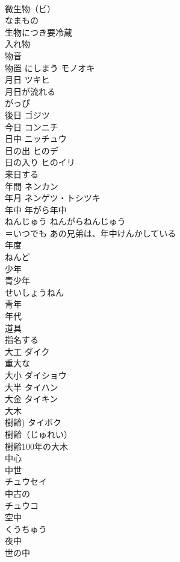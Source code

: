 \documentclass[8pt]{extreport}
\begin{document}
\begin{CJK}{UTF8}{min}
\\	微生物（ビ）
\\	なまもの　
\\	生物につき要冷蔵 
\\	入れ物	
\\	物音	
\\	物置 にしまう	モノオキ 
\\	月日	ツキヒ 
\\	月日が流れる 
\\	がっぴ　
\\	後日	ゴジツ 
\\	今日	コンニチ 
\\	日中	ニッチュウ 
\\	日の出	ヒのデ 
\\	日の入り	ヒのイリ 
\\	来日する	
\\	年間	ネンカン 
\\	年月	ネンゲツ・トシツキ 
\\	年中 年がら年中	
\\	ねんじゅう ねんがらねんじゅう 
\\	＝いつでも あの兄弟は、年中けんかしている
\\	年度	
\\	ねんど
\\	少年	
\\	青少年	
\\	せいしょうねん
\\	青年	
\\	年代	
\\	道具	
\\	指名する	
\\	大工	ダイク 
\\	重大な	
\\	大小	ダイショウ 
\\	大半	タイハン 
\\	大金	タイキン 
\\	大木 
\\	樹齢)	タイボク 
\\	樹齢（じゅれい）
\\	樹齢100年の大木
\\	中心	
\\	中世	
\\	チュウセイ
\\	中古の
\\	チュウコ 
\\	空中	
\\	くうちゅう
\\	夜中	
\\	世の中	

\end{CJK}
\end{document}
